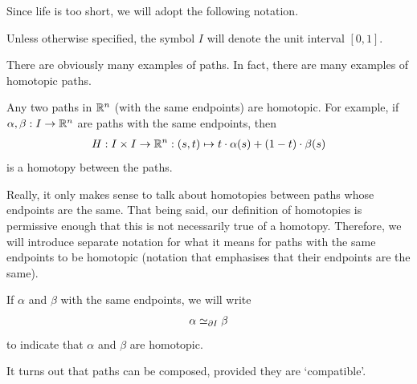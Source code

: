 Since life is too short, we will adopt the following notation.

\begin{boxnotation}
    Unless otherwise specified, the symbol $I$ will denote the unit interval $[0, 1]$.
\end{boxnotation}

There are obviously many examples of paths. In fact, there are many examples of homotopic paths.

\begin{boxexample}
    Any two paths in $\mathbb{R}^n$ (with the same endpoints) are homotopic. For example, if $\alpha, \beta : I \to \mathbb{R}^n$ are paths with the same endpoints, then
    \begin{align*}
        H : I \times I \to \mathbb{R}^n : (s, t) \mapsto t \cdot \alpha(s) + (1 - t) \cdot \beta(s)
    \end{align*}
    is a homotopy between the paths.
\end{boxexample}

Really, it only makes sense to talk about homotopies between paths whose endpoints are the same. That being said, our definition of homotopies is permissive enough that this is not necessarily true of a homotopy. Therefore, we will introduce separate notation for what it means for paths with the same endpoints to be homotopic (notation that emphasises that their endpoints are the same).

\begin{boxnotation}
    If $\alpha$ and $\beta$ with the same endpoints, we will write
    \begin{align*}
        \alpha \simeq_{\partial I} \beta
    \end{align*}
    to indicate that $\alpha$ and $\beta$ are homotopic.
\end{boxnotation}

It turns out that paths can be composed, provided they are `compatible'.

